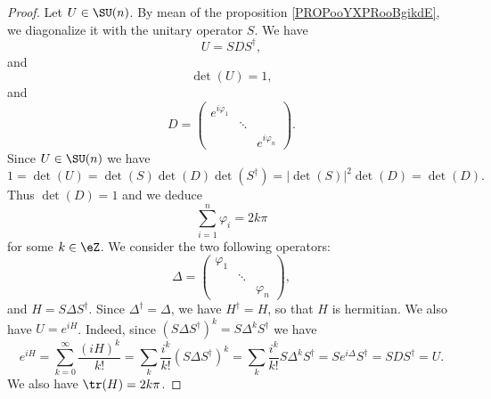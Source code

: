 \begin{proof}
    Let \( U\in \SU(n)\). By mean of the proposition \ref{PROPooYXPRooBgikdE}, we diagonalize it with the unitary operator \( S\). We have 
    \begin{equation}
        U=SDS^{\dag},
    \end{equation}
    and
    \begin{equation}
        \det(U)=1,
    \end{equation}
    and
    \begin{equation}
        D=\begin{pmatrix}
            e^{i\varphi_1}    &       &       \\
                &   \ddots    &       \\
                &       &    e^{i\varphi_n}
        \end{pmatrix}.
    \end{equation}
    Since \( U\in\SU(n)\) we have
    \begin{equation}
        1=\det(U)=\det(S)\det(D)\det(S^{\dag})=| \det(S) |^2\det(D)=\det(D).
    \end{equation}
    Thus \( \det(D)=1\) and we deduce
    \begin{equation}
        \sum_{i=1}^n\varphi_i=2k\pi
    \end{equation}
    for some \( k\in \eZ\). We consider the two following  operators:
    \begin{equation}
        \Delta=\begin{pmatrix}
            \varphi_1    &       &       \\
                &   \ddots    &       \\
                &       &   \varphi_n
        \end{pmatrix},
    \end{equation}
    and \( H=S\Delta S^{\dag}\). Since \( \Delta^{\dag}=\Delta\), we have \( H^{\dag}=H\), so that \( H\) is hermitian. We also have \( U= e^{iH}\). Indeed, since \( (S\Delta S^{\dag})^k=S\Delta^kS^{\dag}\) we have
    \begin{equation}
        e^{iH}=\sum_{k=0}^{\infty}\frac{ (iH)^k }{ k! }=\sum_k\frac{ i^k }{ k! }(S\Delta S^{\dag})^k=\sum_k\frac{ i^k }{ k! }S\Delta^kS^{\dag}=S e^{i\Delta}S^{\dag}=SDS^{\dag}=U.
    \end{equation}
    We also have \( \tr(H)=2k\pi\).
    

\end{proof}
